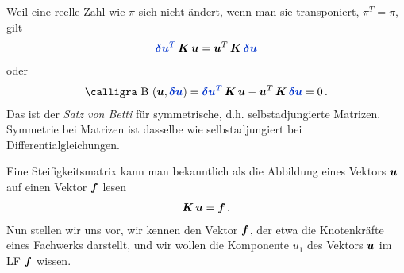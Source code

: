 Weil eine  reelle Zahl wie $\pi$ sich nicht \"{a}ndert, wenn man sie transponiert, $\pi^T = \pi$, gilt
\begin{align}
\textcolor{chapterTitleBlue}{\vek \delta \vek u^T}\,\vek K\,\vek u = \vek u^T\,\vek K\,\textcolor{chapterTitleBlue}{\vek \delta \vek u}
\end{align}
oder
\begin{align}\label{Eq39}
\text{\normalfont\calligra B\,\,}(\vek u,\textcolor{chapterTitleBlue}{\vek \delta \vek u})= \textcolor{chapterTitleBlue}{\vek \delta \vek u^T}\,\vek K\,\vek u - \vek u^T\,\vek K\,\textcolor{chapterTitleBlue}{\vek \delta \vek u} = 0\,.
\end{align}
Das ist der {\em Satz von Betti\/} f\"{u}r symmetrische, d.h. selbstadjungierte Matrizen.  Symmetrie bei Matrizen ist dasselbe wie selbstadjungiert bei Differentialgleichungen.

Eine Steifigkeitsmatrix kann man bekanntlich als die Abbildung eines Vektors $\mbox{\boldmath $u$}$ auf einen Vektor $\mbox{\boldmath $f$}$ lesen
\begin{align}
\mbox{\boldmath $K$}\,\mbox{\boldmath $u$} = \mbox{\boldmath $f$}\,.
\end{align}
Nun stellen wir uns vor, wir kennen den Vektor $\mbox{\boldmath $f$}$, der etwa die Knotenkr\"{a}fte eines Fachwerks darstellt, und wir wollen die Komponente $u_1$ des Vektors $\mbox{\boldmath $u$}$ im LF $\mbox{\boldmath $f$}$ wissen.

